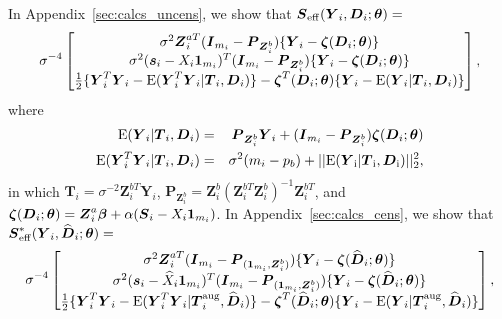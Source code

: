 \documentclass[12pt]{article}
\def\bse{\begin{eqnarray*}}
\def\ese{\end{eqnarray*}}
\def\bse{\begin{eqnarray*}}
\def\ese{\end{eqnarray*}}
\def\bS{{\mathbf S}}
\newcommand{\bzeta}{\mbox{\boldmath $\zeta$}}
\def\bbeta{{\boldsymbol{\beta}}}
\def\btheta{{\boldsymbol{\theta}}}
\def\bone{{\boldsymbol{1}}}
\def\bb{{\boldsymbol b}}
\def\bs{{\boldsymbol s}}
\def\bD{{\boldsymbol D}}
\def\bI{{\boldsymbol I}}
\def\bP{{\boldsymbol P}}
\def\bS{{\boldsymbol S}}
\def\bT{{\boldsymbol T}}
\def\bY{{\boldsymbol Y}}
\def\bZ{{\boldsymbol Z}}
\def\tilD{\bD}
\begin{document}

In Appendix~\ref{sec:calcs_uncens}, we show that $\bS_{\rm{eff}}(\bY_i,\tilD_i;\btheta)=$
\bse
\label{eqn:uncens_eff_score_vec}
\sigma^{-4}\left[
\begin{matrix}
\sigma^2\bZ^{aT}_i(\bI_{m_i} - \bP_{\bZ^b_i})\{\bY_i-\bzeta(\tilD_i;\btheta)\} \\
\sigma^2(\bs_i-X_i\bone_{m_i})^T(\bI_{m_i} - \bP_{\bZ^b_i})\{\bY_i-\bzeta(\tilD_i;\btheta)\} \\
\frac{1}{2}\{\bY_i^T\bY_i-{\rm E}(\bY_i^T\bY_i|\bT_i,\tilD_i)\}-\bzeta^T(\tilD_i;\btheta)\{\bY_i-{\rm E}(\bY_i|\bT_i,\tilD_i)\}
\end{matrix}
\right],
\ese
where
\bse
{\rm E}(\bY_i|\bT_i,\tilD_i)&=&\bP_{\bZ^b_i}\bY_i+(\bI_{m_i}-\bP_{\bZ^b_i})\bzeta(\tilD_i;\btheta)\\
{\rm E}(\bY_i^T\bY_i|\bT_i,\tilD_i)&=&\sigma^2(m_i-p_b)+||\rm{E}(\bY_i|\bT_i,\tilD_i)||^2_2,
\ese
in which $\bT_i=\sigma^{-2}\bZ^{bT}_i\bY_i$,
$\bP_{\bZ^b_i}=\bZ^b_i(\bZ^{bT}_i\bZ^b_i)^{-1}\bZ^{bT}_i$, and $\bzeta(\tilD_i;\btheta)=\bZ^a_i\bbeta  + \alpha(\bS_i - X_i\bone_{m_i})$. In Appendix~\ref{sec:calcs_cens}, we show that $\bS_{\rm{eff}}^*(\bY_i,\widehat{\tilD}_i;\btheta)=$
\bse
\label{eqn:cens_eff_score_vec}
\sigma^{-4}\left[
\begin{matrix}
\sigma^2\bZ^{aT}_i(\bI_{m_i}-\bP_{(\bone_{m_i},\bZ^b_i)})\{\bY_i-\bzeta(\widehat{\tilD}_i;\btheta)\} \\
\sigma^2(\bs_i-\widehat{X}_i\bone_{m_i})^T(\bI_{m_i}-\bP_{(\bone_{m_i},\bZ^b_i)})\{\bY_i-\bzeta(\widehat{\tilD}_i;\btheta)\} \\
\frac{1}{2}\{\bY_i^T\bY_i-{\rm E}(\bY_i^T\bY_i|\bT_i^{\rm aug},\widehat{\tilD}_i)\}-\bzeta^T(\widehat{\tilD}_i;\btheta)\{\bY_i-{\rm E}(\bY_i|\bT_i^{\rm aug},\widehat{\tilD}_i)\}
\end{matrix}
\right],
\ese
\end{document}
